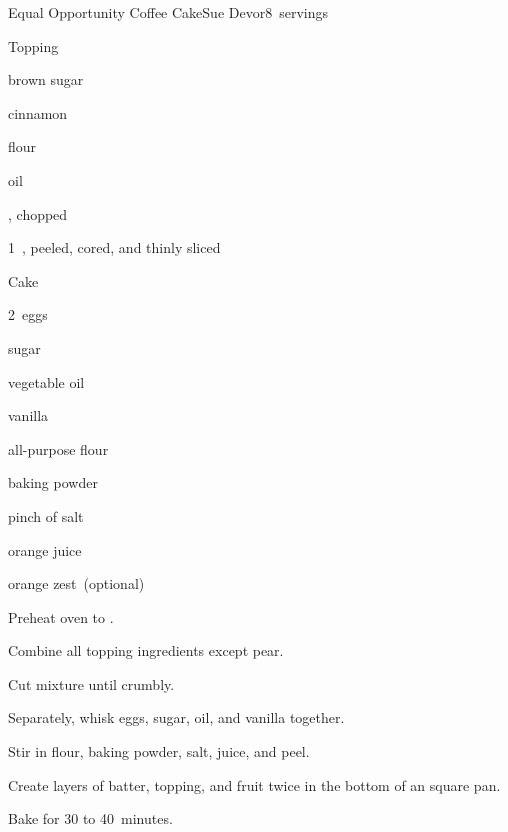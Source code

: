 \begin{recipe}{Equal Opportunity Coffee Cake}{Sue Devor}{8~servings}

Topping
\begin{ingredients}
\item \C{\half} brown sugar
\item {} cinnamon
\item {} flour
\item {} oil
\item {} , chopped
\item 1~, peeled, cored, and thinly sliced
\end{ingredients}

Cake
\begin{ingredients}
\item 2~eggs
\item {} sugar
\item \C{\half} vegetable oil
\item \tp{\half} vanilla
\item \C{1\half} all-purpose flour
\item {} baking powder
\item pinch of salt
\item \C{\half} orange juice
\item {} orange zest~(optional)
\end{ingredients}

\begin{directions}
\item Preheat oven to .
\item Combine all topping ingredients except pear.
\item Cut mixture until crumbly.
\item Separately, whisk eggs, sugar, oil, and vanilla together.
\item Stir in flour, baking powder, salt, juice, and peel.
\item Create layers of batter, topping, and fruit twice in the bottom of an  square pan.
\item Bake for 30 to 40~minutes.
\end{directions}
\end{recipe}

